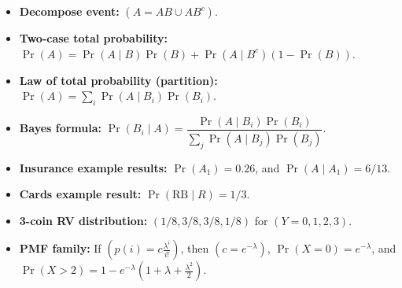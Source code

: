 \documentclass[11pt]{article}
\begin{document}
\begin{itemize}
\item \textbf{Decompose event:} $(A=AB\cup AB^c)$.
\item \textbf{Two-case total probability:}  
$\Pr(A)=\Pr(A\mid B)\Pr(B)+\Pr(A\mid B^c)(1-\Pr(B))$.
\item \textbf{Law of total probability (partition):}  
$\Pr(A)=\sum_i \Pr(A\mid B_i)\Pr(B_i)$.
\item \textbf{Bayes formula:}  
$\Pr(B_i\mid A)=\dfrac{\Pr(A\mid B_i)\Pr(B_i)}{\sum_j \Pr(A\mid B_j)\Pr(B_j)}$.
\item \textbf{Insurance example results:}  
$\Pr(A_1)=0.26$, and $\Pr(A\mid A_1)=6/13$.
\item \textbf{Cards example result:} $\Pr(\text{RB}\mid R)=1/3$.
\item \textbf{3-coin RV distribution:} $(1/8, 3/8, 3/8, 1/8)$ for $(Y=0,1,2,3)$.
\item \textbf{PMF family:} If $\left(p(i)=c\frac{\lambda^i}{i!}\right)$, then $(c=e^{-\lambda})$, $\Pr(X=0)=e^{-\lambda}$, and
$\Pr(X>2)=1-e^{-\lambda}\left(1+\lambda+\frac{\lambda^2}{2}\right)$.
\end{itemize}
\end{document}
